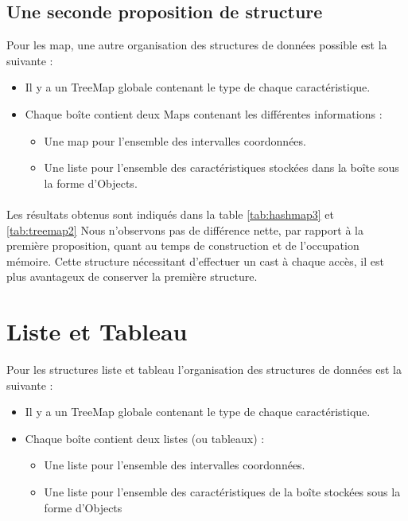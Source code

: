 \subsection{Une seconde proposition de structure}
Pour les map, une autre organisation des structures de données possible est la suivante :
\begin{itemize}
\item Il y a un TreeMap globale contenant le type de chaque caractéristique.
 \item Chaque boîte contient deux Maps contenant les différentes informations :
\begin{itemize}
 \item Une map pour l'ensemble des intervalles coordonnées.
\item Une liste pour l'ensemble des caractéristiques stockées dans la boîte sous la forme d'Objects.
\end{itemize}
\end{itemize}

\paragraph{}Les résultats obtenus sont indiqués dans la table \ref{tab:hashmap3} et \ref{tab:treemap2}
Nous n'observons pas de différence nette, par rapport à la première proposition, quant au temps de construction et de l'occupation mémoire. Cette structure nécessitant d'effectuer un cast à chaque accès, il est plus avantageux de conserver la première structure.


\section{Liste et Tableau}
Pour les structures liste et tableau l'organisation des structures de données est la suivante :
\begin{itemize}
\item Il y a un TreeMap globale contenant le type de chaque caractéristique.
 \item Chaque boîte contient deux listes (ou tableaux) :
\begin{itemize}
 \item Une liste pour l'ensemble des intervalles coordonnées.
\item Une liste pour l'ensemble des caractéristiques de la boîte stockées sous la forme d'Objects
\end{itemize}
\end{itemize}

